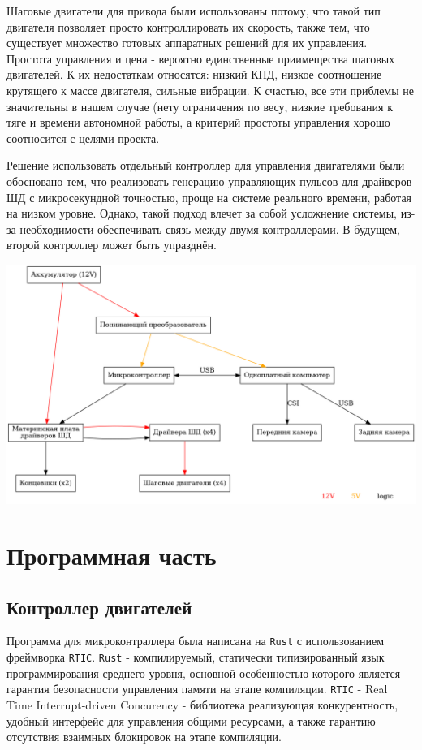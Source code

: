 \documentclass[11pt]{article}
\begin{document}
Шаговые двигатели для привода были использованы потому, что такой тип двигателя позволяет просто контроллировать их скорость, также тем, что существует множество готовых аппаратных решений для их управления. Простота управления и цена - вероятно единственные приимещества шаговых двигателей. К их недостаткам относятся: низкий КПД, низкое соотношение крутящего к массе двигателя, сильные вибрации. К счастью, все эти приблемы не значительны в нашем случае (нету ограничения по весу, низкие требования к тяге и времени автономной работы, а критерий простоты управления хорошо соотносится с целями проекта.

Решение использовать отдельный контроллер для управления двигателями были обосновано тем, что реализовать генерацию управляющих пульсов для драйверов ШД с микросекундной точностью, проще на системе реального времени, работая на низком уровне. Однако, такой подход влечет за собой усложнение системы, из-за необходимости обеспечивать связь между двумя контроллерами. В будущем, второй контроллер может быть упразднён.

\begin{center}
\includegraphics[width=.9\linewidth]{images/electronics-diag.png}
\end{center}
\section{Программная часть}
\label{sec:org73fd70a}
\subsection{Контроллер двигателей}
\label{sec:org16dcbec}
Программа для микроконтраллера была написана на \texttt{Rust} с использованием фреймворка \texttt{RTIC}. \texttt{Rust} - компилируемый, статически типизированный язык программирования среднего уровня, основной особенностью которого является гарантия безопасности управления памяти на этапе компиляции. \texttt{RTIC} - Real Time Interrupt-driven Concurency - библиотека реализующая конкурентность, удобный интерфейс для управления общими ресурсами, а также гарантию отсутствия взаимных блокировок на этапе компиляции.
\end{document}
